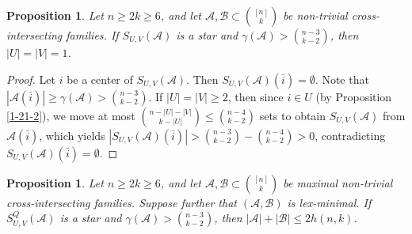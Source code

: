 \documentclass[a4paper,11pt]{article}
\newtheorem{proposition}[theorem]{Proposition}
\newcommand{\m}{\mathcal}
\begin{document}
\begin{proposition}\label{shifta}
Let $n\ge 2k\ge 6$, and let $\mathcal{A}, \mathcal{B} \subset {[n]\choose k}$ be non-trivial cross-intersecting families. 
If $S_{U,V}(\m A)$ is a star and $\gamma(\m A)>{n-3\choose k-2}$, then $|U|=|V|=1$.
\end{proposition}
\begin{proof}
Let $i$ be a center of $S_{U,V}(\mathcal{A})$. 
Then $S_{U,V}(\mathcal{A})(\bar{i})=\emptyset$.
Note that $|\mathcal{A}(\bar{i})|\ge \gamma(\mathcal{A})> {n-3\choose k-2}$. 
If $|U|=|V|\ge 2$, then since $i\in U$ (by Proposition \ref{1-21-2}), we move at most ${n-|U|-|V|\choose k-|U|}\le {n-4\choose k-2}$ sets to obtain $S_{U,V}(\mathcal{A})$ from $\m A(\bar i)$, which yields  
$|S_{U,V}(\mathcal{A})(\bar{i})|>{n-3\choose k-2}-{n-4\choose k-2}>0$, contradicting $S_{U,V}(\mathcal{A})(\bar{i})=\emptyset$.
\end{proof}

\begin{proposition}\label{12-31-1}
Let $n\ge 2k\ge 6$, and let $\mathcal{A}, \mathcal{B} \subset {[n]\choose k}$ be maximal non-trivial cross-intersecting families. 
Suppose further that $(\m A, \m B)$ is lex-minimal.
If $S_{U,V}^Q(\m A)$ is a star and $\gamma(\m A)>{n-3\choose k-2}$, 
then $|\m A|+|\m B|\le 2h(n,k)$.
\end{proposition}
\end{document}
